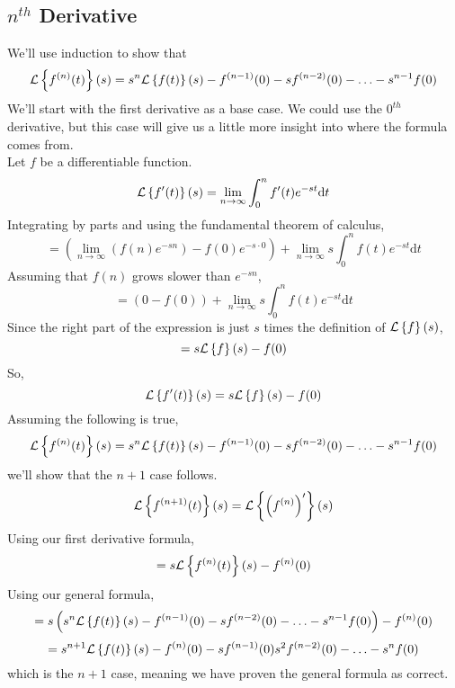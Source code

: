 \subsection{$n^{th}$ Derivative}
\noindent
We'll use induction to show that
\begin{equation*}
\mathcal{L}\left\{ f^{(n)}(t) \right\}\left(s\right) = s^n\mathcal{L}\left\{ f(t) \right\}\left(s\right) - f^{(n-1)}(0) - sf^{(n-2)}(0) - \ldots - s^{n-1}f(0)
\end{equation*}
We'll start with the first derivative as a base case. We could use the $0^{th}$ derivative, but this case will give us a little more insight into where the formula comes from.\\
Let $f$ be a differentiable function.
\begin{equation*}
\mathcal{L}\left\{ f'(t) \right\}\left(s\right) = \lim\limits_{n\to\infty}{\int_{0}^{n}{f'(t)e^{-st}\mathrm{d}t}}
\end{equation*}
Integrating by parts and using the fundamental theorem of calculus,
\begin{equation*}
	 = \left(\lim\limits_{n\to\infty}{\left(f(n)e^{-sn}\right)} - f(0)e^{-s\cdot 0}\right) + \lim\limits_{n\to\infty}{s\int_{0}^{n}{f(t)e^{-st} \mathrm{d}t}}
\end{equation*}
Assuming that $f(n)$ grows slower than $e^{-sn}$,
\begin{equation*}
	 = \left(0 - f(0)\right) + \lim\limits_{n\to\infty}{s\int_{0}^{n}{f(t)e^{-st} \mathrm{d}t}}
\end{equation*}
Since the right part of the expression is just $s$ times the definition of $\mathcal{L}\left\{ f \right\}\left(s\right)$,
\begin{equation*}
	 = s\mathcal{L}\left\{ f \right\}\left(s\right) - f(0)
\end{equation*}
So,
\begin{equation*}
	\mathcal{L}\left\{ f'(t) \right\}\left(s\right) = s\mathcal{L}\left\{ f \right\}\left(s\right) - f(0)
\end{equation*}
Assuming the following is true,
\begin{equation*}
	\mathcal{L}\left\{ f^{(n)}(t) \right\}\left(s\right) = s^n\mathcal{L}\left\{ f(t) \right\}\left(s\right) - f^{(n-1)}(0) - sf^{(n-2)}(0) - \ldots - s^{n-1}f(0)
\end{equation*}
we'll show that the $n+1$ case follows.
\begin{equation*}
	\mathcal{L}\left\{ f^{(n+1)}(t) \right\}\left(s\right) = \mathcal{L}\left\{ \left(f^{(n)}\right)' \right\}\left(s\right)
\end{equation*}
Using our first derivative formula,
\begin{equation*}
	 = s\mathcal{L}\left\{ f^{(n)}(t) \right\}\left(s\right) - f^{(n)}(0)
\end{equation*}
Using our general formula,
\begin{equation*}
	= s \left(s^n\mathcal{L}\left\{ f(t) \right\}\left(s\right) - f^{(n-1)}(0) - sf^{(n-2)}(0) - \ldots - s^{n-1}f(0)\right) - f^{(n)}(0)
\end{equation*}
\begin{equation*}
 = s^{n+1}\mathcal{L}\left\{ f(t) \right\}\left(s\right) - f^{(n)}(0) - sf^{(n-1)}(0) s^2f^{(n-2)}(0) - \ldots - s^{n}f(0)
\end{equation*}
which is the $n+1$ case, meaning we have proven the general formula as correct.